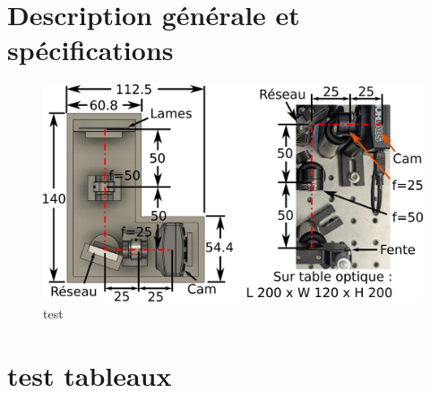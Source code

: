 \documentclass[11pt,letterpaper]{article}
\begin{document}
\section{Description générale et spécifications}

\begin{figure}[H]
  \centering
  \includegraphics[scale=1.75]{schema_spectros.png}
  \caption{test}
  \label{test}
\end{figure}


\section{test tableaux}
\end{document}

